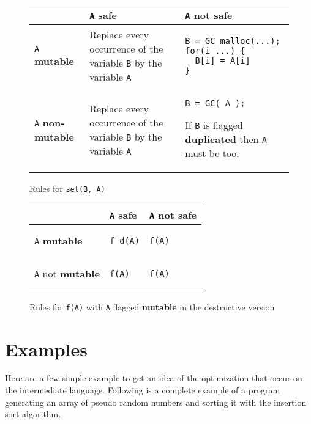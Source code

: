 \documentclass[12pt,a4paper]{article}
\newcommand{\cl}[1]{\texttt{#1}}
\newcommand{\mut}{\textbf{mutable }}
\newcommand{\nmut}{\textbf{non-mutable }}
\newcommand{\bang}{\textbf{mutable }}
\newcommand{\safe}{\textbf{safe }}
\newcommand{\dupl}{\textbf{duplicated }}
\begin{document}
\begin{figure}[!ht]
\begin{tabular}{|p{4.5cm}|p{6cm}|p{6.5cm}|}
\hline
             & \cl{A} \safe & \cl{A} not \safe \\ \hline
\cl{A} \mut  & Replace every occurrence of the variable \cl{B} by the variable \cl{A} & \begin{lstlisting}
B = GC_malloc(...);
for(i ...) {
  B[i] = A[i]
}
\end{lstlisting} \\ \hline
\cl{A} \nmut & Replace every occurrence of the variable \cl{B} by the variable \cl{A} & \begin{lstlisting}
B = GC( A );
\end{lstlisting}
If \cl{B} is flagged \dupl then \cl{A} must be too.
\\ \hline
\end{tabular}
\caption{Rules for \cl{set(B, A)}}
\end{figure}



\begin{figure}[!ht]
\begin{tabular}{|p{4.5cm}|p{6cm}|p{6.5cm}|}
\hline
             & \cl{A} \safe & \cl{A} not \safe \\ \hline
\cl{A} \bang  &
\begin{lstlisting}
f_d(A)
\end{lstlisting} & \begin{lstlisting}
f(A)
\end{lstlisting} \\ \hline
\cl{A} not \bang & \begin{lstlisting}
f(A)
\end{lstlisting} & \begin{lstlisting}
f(A)
\end{lstlisting} \\ \hline
\end{tabular}
\caption{Rules for \cl{f(A)} with \cl{A} flagged \bang in the destructive version}
\end{figure}


\newpage

\section{Examples}
Here are a few simple example to get an idea of the optimization that occur on the intermediate language. Following is a complete example of a program generating an array of pseudo random numbers and sorting it with the insertion sort algorithm.
\end{document}
